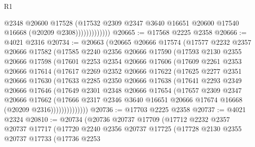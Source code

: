 \begin{lexlean}{R1}
\begin{coremodule}
                          @2348
                          @20600
                          @17528
                          (@17532
                            @2309
                            @2347
                            @3640
                            @16651
                            @20600
                            @17540
                            @16668
                            (@20209 @2308)))))))))))))
@20665 := @17568 @2225 @2358
@20666 := @4021 @2316
@20734 := @20663
    (@20665
      @20666
      @17574
      (@17577
        @2232
        @2357
        @20666
        @17582
        (@17585
          @2240
          @2356
          @20666
          @17590
          (@17593
            @2130
            @2355
            @20666
            @17598
            (@17601
              @2253
              @2354
              @20666
              @17606
              (@17609
                @2261
                @2353
                @20666
                @17614
                (@17617
                  @2269
                  @2352
                  @20666
                  @17622
                  (@17625
                    @2277
                    @2351
                    @20666
                    @17630
                    (@17633
                      @2285
                      @2350
                      @20666
                      @17638
                      (@17641
                        @2293
                        @2349
                        @20666
                        @17646
                        (@17649
                          @2301
                          @2348
                          @20666
                          @17654
                          (@17657
                            @2309
                            @2347
                            @20666
                            @17662
                            (@17666
                              @2317
                              @2346
                              @3640
                              @16651
                              @20666
                              @17674
                              @16668
                              (@20209 @2316))))))))))))))
@20736 := @17703 @2225 @2358
@20737 := @4021 @2324
@20810 := @20734
    (@20736
      @20737
      @17709
      (@17712
        @2232
        @2357
        @20737
        @17717
        (@17720
          @2240
          @2356
          @20737
          @17725
          (@17728
            @2130
            @2355
            @20737
            @17733
            (@17736
              @2253

\end{coremodule}
\end{lexlean}
